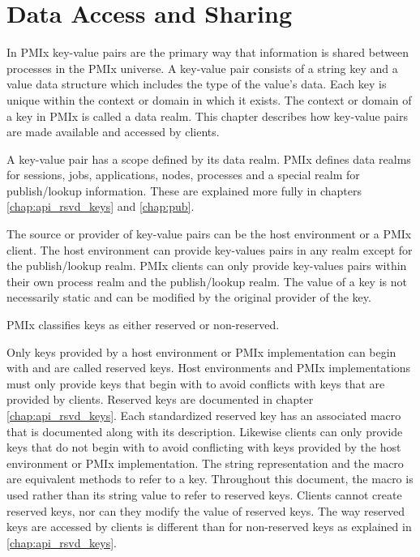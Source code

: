 \chapter{Data Access and Sharing}
\label{chap:data_sharing}

In \ac{PMIx} key-value pairs are the primary way that information is shared 
between processes in the \ac{PMIx} universe.  
A key-value pair consists of a string key and a value data structure
which includes the type of the value's data.  
Each key is unique within the context or domain in which it exists.
The context or domain of a key in PMIx is called a data realm.  
This chapter describes how key-value pairs are made available and accessed by clients.

A key-value pair has a scope defined by its data realm.  
PMIx defines data realms for sessions, jobs, applications, nodes, processes and a special 
realm for publish/lookup information.   
These are explained more fully in chapters \ref{chap:api_rsvd_keys} and \ref{chap:pub}.

The source or provider of key-value pairs can be the host environment or a \ac{PMIx} client.  
The host environment can provide key-values pairs in any realm except for the publish/lookup realm.
PMIx clients can only provide key-values pairs within their own process realm and the publish/lookup realm.
The value of a key is not necessarily static and can be modified by the original provider of the key.

\ac{PMIx} classifies keys as either reserved or non-reserved.

Only keys provided by a host environment or \ac{PMIx} implementation can begin with  and are called reserved keys.  
Host environments and \ac{PMIx} implementations must only provide keys that begin with  to avoid conflicts with keys that are provided by clients.
Reserved keys are documented in chapter \ref{chap:api_rsvd_keys}.
Each standardized reserved key has an associated macro that is documented along with its description.
Likewise clients can only provide keys that do not begin with  to avoid conflicting with keys provided by the host environment or \ac{PMIx} implementation.   
The string representation and the macro are equivalent methods to refer to a key.
Throughout this document, the macro is used rather than its string value to refer to reserved keys.
Clients cannot create reserved keys, nor can they modify the value of reserved keys.
The way reserved keys are accessed by clients 
is different than for non-reserved keys as explained in \ref{chap:api_rsvd_keys}.

